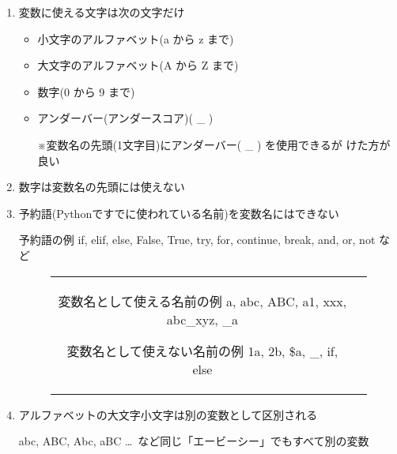 \documentclass{jsarticle}
\begin{document}
\begin{enumerate}
	\item{変数に使える文字は次の文字だけ}
	\begin{itemize}
		\item{小文字のアルファベット(a から z まで)}
		\item{大文字のアルファベット(A から Z まで)}
		\item{数字(0 から 9 まで)}
		\item{アンダーバー(アンダースコア)( \_ )} \par
		※変数名の先頭(1文字目)にアンダーバー( \_ ) を使用できるが けた方が良い
	\end{itemize}
	\item{数字は変数名の先頭には使えない}
	\item{予約語(Pythonですでに使われている名前)を変数名にはできない}
	\begin{itembox}[l]{予約語の例}
		if, \; elif, \; else, \; False, \; True, \; try, \; for, \; continue, \; break, \; and, \; or, \; not \; など
	\end{itembox}

	\begin{figure}[htp]
		\begin{tabular}{cc} \hspace{3mm}
			\begin{minipage}[ht]{.48\textwidth}
				\begin{itembox}[l]{変数名として使える名前の例}
					a, \;abc, \;ABC,\; a1, \; xxx, \; abc\_xyz, \; \_a
				\end{itembox}
			\end{minipage} \hspace{5mm}
			\begin{minipage}[ht]{.4\textwidth}
				\begin{itembox}[l]{変数名として使えない名前の例}
					1a, \; 2b, \;  \$a, \; 1\_, \; if, \; else
				\end{itembox}
			\end{minipage}
		\end{tabular}
	\end{figure}
	\item{アルファベットの大文字小文字は別の変数として区別される} \par
	abc, \; ABC, \; Abc, \; aBC \; \ldots \, など同じ「エービーシー」でもすべて別の変数
\end{enumerate}
\end{document}
